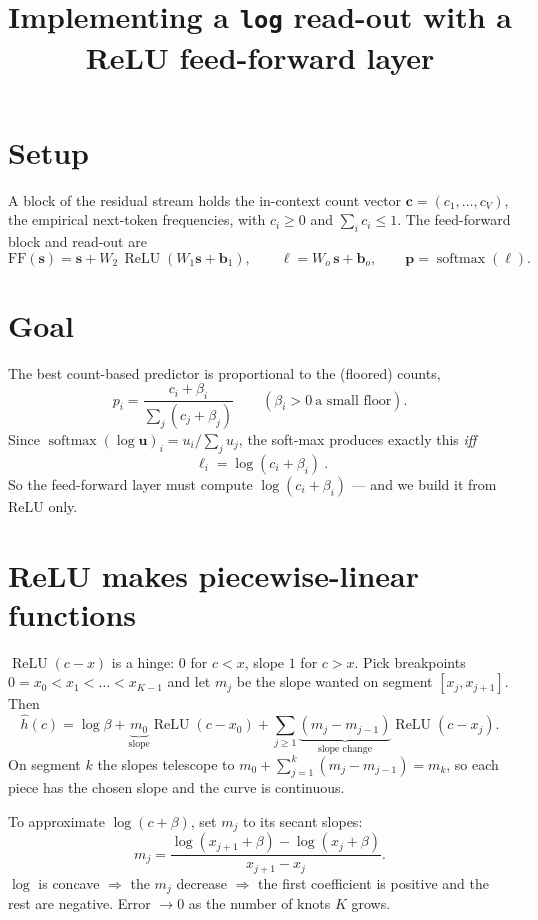\documentclass[11pt]{article}
\title{Implementing a \texttt{log} read-out with a ReLU feed-forward layer}
\date{}
\newcommand{\relu}{\operatorname{ReLU}}
\newcommand{\sm}{\operatorname{softmax}}
\begin{document}
\maketitle
\vspace{-2.5em}

\section{Setup}
A block of the residual stream holds the in-context count vector
$\mathbf c=(c_1,\dots,c_V)$, the empirical next-token frequencies, with
$c_i\ge 0$ and $\sum_i c_i\le 1$. The feed-forward block and read-out are
\[
\mathrm{FF}(\mathbf s)=\mathbf s+W_2\,\relu(W_1\mathbf s+\mathbf b_1),
\qquad
\boldsymbol\ell = W_o\,\mathbf s+\mathbf b_o,
\qquad
\mathbf p=\sm(\boldsymbol\ell).
\]

\section{Goal}
The best count-based predictor is proportional to the (floored) counts,
\[
p_i=\frac{c_i+\beta_i}{\sum_j (c_j+\beta_j)} \qquad(\beta_i>0\ \text{a small floor}).
\]
Since $\sm(\log\mathbf u)_i=u_i/\sum_j u_j$, the soft-max produces exactly this \emph{iff}
\begin{equation}\label{eq:goal}
\boxed{\ \ell_i=\log(c_i+\beta_i)\ }.
\end{equation}
So the feed-forward layer must compute $\log(c_i+\beta_i)$ --- and we build it from ReLU only.

\section{ReLU makes piecewise-linear functions}
$\relu(c-x)$ is a hinge: $0$ for $c<x$, slope $1$ for $c>x$. Pick breakpoints
$0=x_0<x_1<\dots<x_{K-1}$ and let $m_j$ be the slope wanted on segment $[x_j,x_{j+1}]$.
Then
\begin{equation}\label{eq:pl}
\hat h(c)=\log\beta+\underbrace{m_0}_{\text{slope}}\relu(c-x_0)
+\sum_{j\ge 1}\underbrace{(m_j-m_{j-1})}_{\text{slope change}}\relu(c-x_j).
\end{equation}
On segment $k$ the slopes telescope to $m_0+\sum_{j=1}^{k}(m_j-m_{j-1})=m_k$, so each
piece has the chosen slope and the curve is continuous.

To approximate $\log(c+\beta)$, set $m_j$ to its secant slopes:
\begin{equation}\label{eq:slopes}
m_j=\frac{\log(x_{j+1}+\beta)-\log(x_j+\beta)}{x_{j+1}-x_j}.
\end{equation}
$\log$ is concave $\Rightarrow$ the $m_j$ decrease $\Rightarrow$ the first coefficient is
positive and the rest are negative. Error $\to 0$ as the number of knots $K$ grows.
\end{document}
